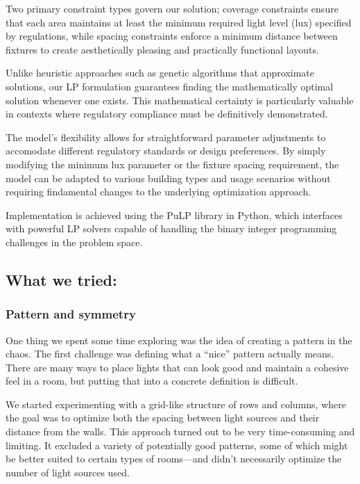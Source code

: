 \documentclass{article}
\begin{document}
Two primary constraint types govern our solution; coverage constraints ensure that each area maintains at least the minimum required light level 
(lux) specified by regulations, while spacing constraints enforce a minimum distance between fixtures to create aesthetically pleasing and 
practically functional layouts. 

Unlike heuristic approaches such as genetic algorithms that approximate solutions, our LP formulation guarantees finding the mathematically optimal 
solution whenever one exists. This mathematical certainty is particularly valuable in contexts where regulatory compliance must be definitively
demonstrated. 

The model's flexibility allows for straightforward parameter adjustments to accomodate different regulatory standards or design preferences. 
By simply modifying the minimum lux parameter or the fixture spacing requirement, the model can be adapted to various building types and usage 
scenarios without requiring findamental changes to the underlying optimization approach.

Implementation is achieved using the PuLP library in Python, which interfaces with powerful LP solvers capable of handling the binary 
integer programming challenges in the problem space.

\newpage

\subsection{What we tried: }

\subsubsection{Pattern and symmetry}
One thing we spent some time exploring was the idea of creating a pattern in the chaos. The first challenge was defining what a “nice” pattern actually means. There are many ways to place lights that can look good and maintain a cohesive feel in a room, but putting that into a concrete definition is difficult.

We started experimenting with a grid-like structure of rows and columns, where the goal was to optimize both the spacing between light sources and their distance from the walls. This approach turned out to be very time-consuming and limiting. It excluded a variety of potentially good patterns, some of which might be better suited to certain types of rooms—and didn’t necessarily optimize the number of light sources used.
\end{document}
